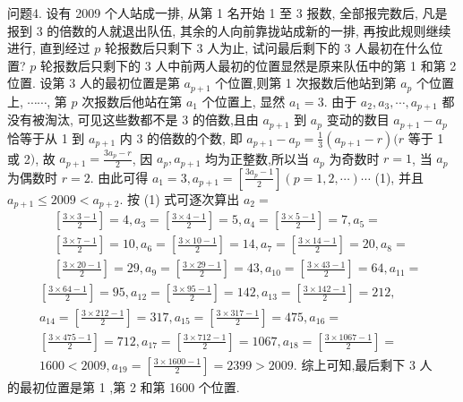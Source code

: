 问题4. 设有 2009 个人站成一排, 从第 1 名开始 1 至 3 报数, 全部报完数后, 凡是报到 3 的倍数的人就退出队伍, 其余的人向前靠拢站成新的一排, 再按此规则继续进行, 直到经过 $p$ 轮报数后只剩下 3 人为止, 试问最后剩下的 3 人最初在什么位置?
$p$ 轮报数后只剩下的 3 人中前两人最初的位置显然是原来队伍中的第 1 和第 2 位置.
设第 3 人的最初位置是第 $a_{p+1}$ 个位置,则第 1 次报数后他站到第 $a_p$ 个位置上, $\cdots \cdots$, 第 $p$ 次报数后他站在第 $a_1$ 个位置上, 显然 $a_1=3$. 由于 $a_2, a_3, \cdots, a_{p+1}$ 都没有被淘汰, 可见这些数都不是 3 的倍数,且由 $a_{p+1}$ 到 $a_p$ 变动的数目 $a_{p+1}-a_p$ 恰等于从 1 到 $a_{p+1}$ 内 3 的倍数的个数, 即 $a_{p+1}-a_p= \frac{1}{3}\left(a_{p+1}-r\right)(r$ 等于 1 或 2$)$, 故 $a_{p+1}=\frac{3 a_p-r}{2}$, 因 $a_p, a_{p+1}$ 均为正整数,所以当 $a_p$ 为奇数时 $r=1$, 当 $a_p$ 为偶数时 $r=2$. 由此可得 $a_1=3, a_{p+1}=\left[\frac{3 a_p-1}{2}\right] (p=1,2, \cdots) \cdots$ (1), 并且 $a_{p+1} \leqslant 2009<a_{p+2}$. 按 (1) 式可逐次算出 $a_2=$
$$
\begin{aligned}
& {\left[\frac{3 \times 3-1}{2}\right]=4, a_3=\left[\frac{3 \times 4-1}{2}\right]=5, a_4=\left[\frac{3 \times 5-1}{2}\right]=7, a_5=} \\
& {\left[\frac{3 \times 7-1}{2}\right]=10, a_6=\left[\frac{3 \times 10-1}{2}\right]=14, a_7=\left[\frac{3 \times 14-1}{2}\right]=20, a_8=} \\
& {\left[\frac{3 \times 20-1}{2}\right]=29, a_9=\left[\frac{3 \times 29-1}{2}\right]=43, a_{10}=\left[\frac{3 \times 43-1}{2}\right]=64, a_{11}=}
\end{aligned}
$$
$$
\begin{aligned}
& {\left[\frac{3 \times 64-1}{2}\right]=95, a_{12}=\left[\frac{3 \times 95-1}{2}\right]=142, a_{13}=\left[\frac{3 \times 142-1}{2}\right]=212,} \\
& a_{14}=\left[\frac{3 \times 212-1}{2}\right]=317, a_{15}=\left[\frac{3 \times 317-1}{2}\right]=475, a_{16}= \\
& {\left[\frac{3 \times 475-1}{2}\right]=712, a_{17}=\left[\frac{3 \times 712-1}{2}\right]=1067, a_{18}=\left[\frac{3 \times 1067-1}{2}\right]=} \\
& 1600<2009, a_{19}=\left[\frac{3 \times 1600-1}{2}\right]=2399>2009 . \text { 综上可知,最后剩下 } 3 \text { 人 }
\end{aligned}
$$
的最初位置是第 1 ,第 2 和第 1600 个位置.



